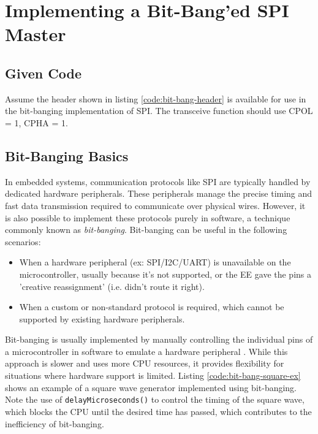 \documentclass[main.tex]{subfiles}
\begin{document}
\section{Implementing a Bit-Bang'ed SPI Master}

\subsection{Given Code}
Assume the header shown in listing \ref{code:bit-bang-header} is available for use in the bit-banging implementation of SPI. The transceive function should use CPOL = 1, CPHA = 1. 



\spoilerline


\subsection{Bit-Banging Basics}
In embedded systems, communication protocols like SPI are typically handled by dedicated hardware peripherals. These peripherals manage the precise timing and fast data transmission required to communicate over physical wires. However, it is also possible to implement these protocols purely in software, a technique commonly known as \textit{bit-banging}. Bit-banging can be useful in the following scenarios:
\begin{itemize}
    \item When a hardware peripheral (ex: SPI/I2C/UART) is unavailable on the microcontroller, usually because it's not supported, or the EE gave the pins a 'creative reassignment' (i.e. didn't route it right).
    \item When a custom or non-standard protocol is required, which cannot be supported by existing hardware peripherals.
\end{itemize}

\noindent Bit-banging is usually implemented by manually controlling the individual pins of a microcontroller in software to emulate a hardware peripheral \cite{looi_bitbanging}. While this approach is slower and uses more CPU resources, it provides flexibility for situations where hardware support is limited. Listing \ref{code:bit-bang-square-ex} shows an example of a square wave generator implemented using bit-banging. Note the use of \texttt{delayMicroseconds()} to control the timing of the square wave, which blocks the CPU until the desired time has passed, which contributes to the inefficiency of bit-banging.
\end{document}
